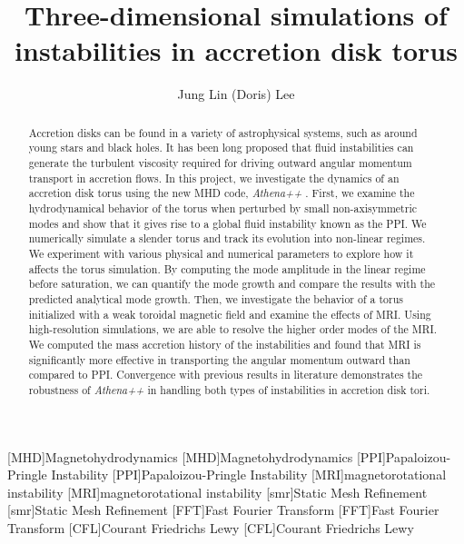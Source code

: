 \documentclass[iop,revtex4]{emulateapj}
\begin{document}
[MHD]{Magnetohydrodynamics}
[MHD]{Magnetohydrodynamics}
[PPI]{Papaloizou-Pringle Instability}
[PPI]{Papaloizou-Pringle Instability}
[MRI]{magnetorotational instability}
[MRI]{magnetorotational instability}
[smr]{Static Mesh Refinement}
[smr]{Static Mesh Refinement}
[FFT]{Fast Fourier Transform}
[FFT]{Fast Fourier Transform}
[CFL]{Courant Friedrichs Lewy}
[CFL]{Courant Friedrichs Lewy}
\newcommand{\app}{\textit{ Athena++ }}
\title{Three-dimensional simulations of instabilities in accretion disk torus}
\author{Jung Lin (Doris) Lee}
 \begin{abstract}
Accretion disks can be found in a variety of astrophysical systems, such as around young stars and black holes. It has been long proposed that fluid instabilities can generate the turbulent viscosity required for driving outward angular momentum transport in accretion flows. In this project, we investigate the dynamics of an accretion disk torus using the new \acf{MHD} code, \app . First, we examine the hydrodynamical behavior of the torus when perturbed by small non-axisymmetric modes and show that it gives rise to a global fluid instability known as the \acf{PPI}. We numerically simulate a slender torus and track its evolution into non-linear regimes. We experiment with various physical and numerical parameters to explore how it affects the torus simulation. By computing the mode amplitude in the linear regime before saturation, we can quantify the mode growth and compare the results with the predicted analytical mode growth. Then, we investigate the behavior of a torus initialized with a weak toroidal magnetic field and examine the effects of \acf{MRI}. Using high-resolution simulations, we are able to resolve the higher order modes of the \ac{MRI}. We computed the mass accretion history of the instabilities and found that \ac{MRI} is significantly more effective in transporting the angular momentum outward than compared to \ac{PPI}. Convergence with previous results in literature demonstrates the robustness of \app  in handling both types of instabilities in accretion disk tori. 
\end{abstract}
\end{document}
